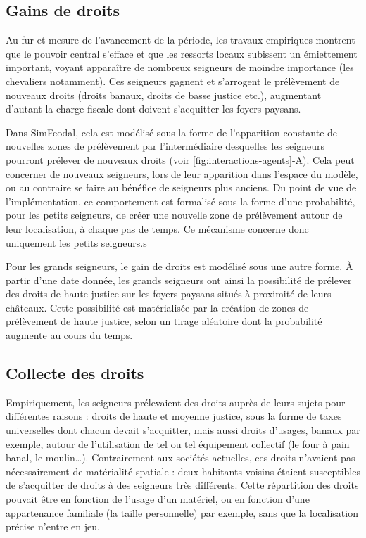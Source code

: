 \subsection{Gains de droits}

Au fur et mesure de l'avancement de la période, les travaux empiriques montrent que le pouvoir central s'efface et que les ressorts locaux subissent un émiettement important, voyant apparaître de nombreux seigneurs de moindre importance (les chevaliers notamment).
Ces seigneurs gagnent et s'arrogent le prélèvement de nouveaux droits (droits banaux, droits de basse justice etc.), augmentant d'autant la charge fiscale dont doivent s'acquitter les foyers paysans.


\begin{tcolorbox}[breakable,left=0pt,right=0pt,top=0pt,bottom=0pt,
	colback=gray!15,colframe=gray!15,width=\dimexpr\textwidth\relax, 
	enlarge left by=0mm, boxsep=5pt,arc=0pt,outer arc=0pt]
Dans SimFeodal, cela est modélisé sous la forme de l'apparition constante de nouvelles zones de prélèvement par l'intermédiaire desquelles les seigneurs pourront prélever de nouveaux droits (voir \cref{fig:interactions-agents}-A).
Cela peut concerner de nouveaux seigneurs, lors de leur apparition dans l'espace du modèle, ou au contraire se faire au bénéfice de seigneurs plus anciens.
Du point de vue de l'implémentation, ce comportement est formalisé sous la forme d'une probabilité, pour les petits seigneurs, de créer une nouvelle zone de prélèvement autour de leur localisation, à chaque pas de temps.
Ce mécanisme concerne donc uniquement les petits seigneurs.s

Pour les grands seigneurs, le gain de droits est modélisé sous une autre forme.
À partir d'une date donnée, les grands seigneurs ont ainsi la possibilité de prélever des droits de haute justice sur les foyers paysans situés à proximité de leurs châteaux.
Cette possibilité est matérialisée par la création de zones de prélèvement de haute justice, selon un tirage aléatoire dont la probabilité augmente au cours du temps.
\end{tcolorbox}

\subsection{Collecte des droits}

Empiriquement, les seigneurs prélevaient des droits auprès de leurs sujets pour différentes raisons : droits de haute et moyenne justice, sous la forme de taxes universelles dont chacun devait s'acquitter, mais aussi droits d'usages, banaux par exemple, autour de l'utilisation de tel ou tel équipement collectif (le four à pain banal, le moulin\ldots).
Contrairement aux sociétés actuelles, ces droits n'avaient pas nécessairement de matérialité spatiale : deux habitants voisins étaient susceptibles de s'acquitter de droits à des seigneurs très différents.
Cette répartition des droits pouvait être en fonction de l'usage d'un matériel, ou en fonction d'une appartenance familiale (la \og taille\fg{} personnelle) par exemple, sans que la localisation précise n'entre en jeu.

